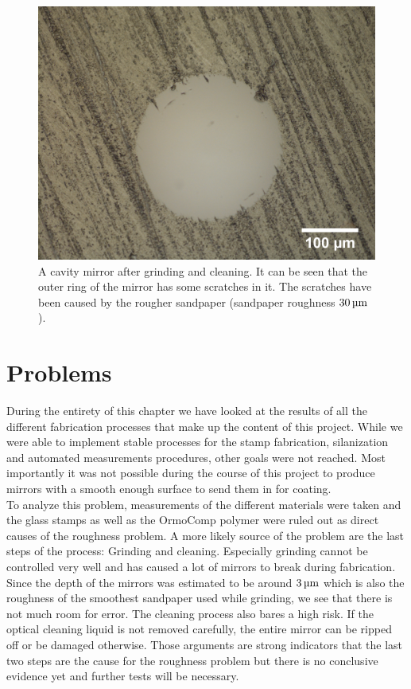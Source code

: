 \begin{figure}[H]
	\includegraphics[scale=0.19]{source/grinded_cleaned}
	\caption{A cavity mirror after grinding and cleaning. It can be seen that the outer ring of the mirror has some scratches in it. The scratches have been caused by the rougher sandpaper (sandpaper roughness $30\um$).}
\end{figure}

\section{Problems}\label{ChapProblems}
During the entirety of this chapter we have looked at the results of all the different fabrication processes that make up the content of this project. While we were able to implement stable processes for the stamp fabrication, silanization and automated measurements procedures, other goals were not reached. Most importantly it was not possible during the course of this project to produce mirrors with a smooth enough surface to send them in for coating.\\
To analyze this problem, measurements of the different materials were taken and the glass stamps as well as the OrmoComp polymer were ruled out as direct causes of the roughness problem. A more likely source of the problem are the last steps of the process: Grinding and cleaning. Especially grinding cannot be controlled very well and has caused a lot of mirrors to break during fabrication. Since the depth of the mirrors was estimated to be around $3\um$ which is also the roughness of the smoothest sandpaper used while grinding, we see that there is not much room for error. The cleaning process also bares a high risk. If the optical cleaning liquid is not removed carefully, the entire mirror can be ripped off or be damaged otherwise. Those arguments are strong indicators that the last two steps are the cause for the roughness problem but there is no conclusive evidence yet and further tests will be necessary.

